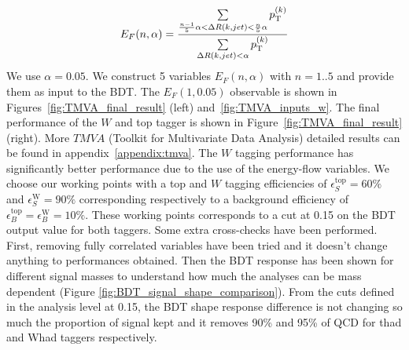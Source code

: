 \documentclass{cernrep}
\begin{document}
\begin{equation}
E_{F}(n,\alpha) =  \frac{\sum \limits_{\frac{n-1}{5}\alpha < \Delta R(k,jet)< \frac{n}{5}\alpha} p_{\text{T}}^{(k)}}{\sum \limits_{\Delta R(k,jet)< \alpha} p_{\text{T}}^{(k)}}
\end{equation}
\newline
We use $\alpha=0.05$. We construct 5 variables $E_{F}(n,\alpha)$ with $n=1..5$ and provide them as input to the BDT. The $E_{F}(1,0.05)$ observable is shown in 
Figures~\ref{fig:TMVA_final_result} (left) and~\ref{fig:TMVA_inputs_w}.
The final performance of the $W$ and top tagger is shown in Figure~\ref{fig:TMVA_final_result} (right). More $TMVA$ (Toolkit for Multivariate Data Analysis) detailed results can be found in appendix~\ref{appendix:tmva}.
The $W$ tagging performance has significantly better performance due to the use of the energy-flow variables. We choose our working points with a top and $W$ tagging efficiencies of $\epsilon_S^{\text{top}}=60\%$ and $\epsilon_S^{\text{W}}=90\%$ corresponding respectively to a background efficiency of $\epsilon_B^{\text{top}}=\epsilon_B^{\text{W}}=10\%$. These working points corresponds to a cut at 0.15 on the BDT output value for both taggers.
\newline
Some extra cross-checks have been performed. First, removing fully correlated variables have been tried and it doesn't change anything to performances obtained. Then the BDT response has been shown for different signal masses to understand how much the analyses can be mass dependent (Figure \ref{fig:BDT_signal_shape_comparison}). From the cuts defined in the analysis level at 0.15, the BDT shape response difference is not changing so much the proportion of signal kept and it removes 90\% and 95\% of QCD for thad and Whad taggers respectively.
\end{document}
